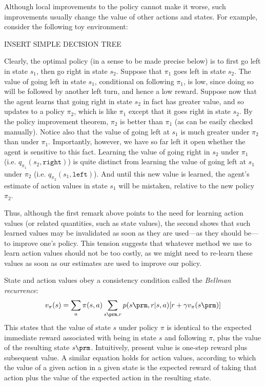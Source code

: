 Although local improvements to the policy cannot make it worse, such improvements usually change the value of other actions and states.
For example, consider the following toy environment:
\begin{center}
	INSERT SIMPLE DECISION TREE
\end{center}
Clearly, the optimal policy (in a sense to be made precise below) is to first go left in state $s_1$, then go right in state $s_2$.
Suppose that $\pi_1$ goes left in state $s_2$.
The value of going left in state $s_1$, conditional on following $\pi_1$, is low, since doing so will be followed by another left turn, and hence a low reward.
Suppose now that the agent learns that going right in state $s_2$ in fact has greater value, and so updates to a policy $\pi_2$, which is like $\pi_1$ except that it goes right in state $s_2$.
By the policy improvement theorem, $\pi_2$ is better than $\pi_1$ (as can be easily checked manually).
Notice also that the value of going left at $s_1$ is much greater under $\pi_2$ than under $\pi_1$.
Importantly, however, we have so far left it open whether the agent is sensitive to this fact.
Learning the value of going right in $s_2$ under $\pi_1$ (i.e. $q_{\pi_1}(s_2, \texttt{right})$) is quite distinct from learning the value of going left at $s_1$ under $\pi_2$ (i.e. $q_{\pi_2}(s_1, \texttt{left})$).
And until this new value is learned, the agent's estimate of action values in state $s_1$ will be mistaken, relative to the new policy $\pi_2$.

Thus, although the first remark above points to the need for learning action values (or related quantities, such as state values), the second shows that such learned values may be invalidated as soon as they are used---as they should be---to improve one's policy.
This tension suggests that whatever method we use to learn action values should not be too costly, as we might need to re-learn these values as soon as our estimates are used to improve our policy.



State and action values obey a consistency condition called the \emph{Bellman recurrence}:
\begin{align*}
	v_{\pi}(s) = \sum_a \pi(s, a) \sum_{s\prm, r} p(s\prm, r | s, a) [r + \gamma v_\pi(s\prm)]
\end{align*}
This states that the value of state $s$ under policy $\pi$ is identical to the expected immediate reward associated with being in state $s$ and following $\pi$, plus the value of the resulting state $s\prm$.
Intuitively, present value is one-step reward plus subsequent value.
A similar equation holds for action values, according to which the value of a given action in a given state is the expected reward of taking that action plus the value of the expected action in the resulting state.

